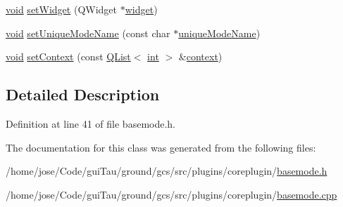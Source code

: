 \begin{DoxyCompactItemize}
\item 
\hyperlink{group___u_a_v_objects_plugin_ga444cf2ff3f0ecbe028adce838d373f5c}{void} \hyperlink{group___core_plugin_gab1cdd30e6cb316270fb623edf88388ff}{set\-Widget} (Q\-Widget $\ast$\hyperlink{group___core_plugin_ga458407ee9529a1d0067acd3e978ca63c}{widget})
\item 
\hyperlink{group___u_a_v_objects_plugin_ga444cf2ff3f0ecbe028adce838d373f5c}{void} \hyperlink{group___core_plugin_ga58eb3bd31c083e486287c4535f0f7379}{set\-Unique\-Mode\-Name} (const char $\ast$\hyperlink{group___core_plugin_ga5712eab4028d979aa83e70cc8dd3962b}{unique\-Mode\-Name})
\item 
\hyperlink{group___u_a_v_objects_plugin_ga444cf2ff3f0ecbe028adce838d373f5c}{void} \hyperlink{group___core_plugin_ga0a0f1f0ef4b5c8d0f4c597564986235c}{set\-Context} (const \hyperlink{class_q_list}{Q\-List}$<$ \hyperlink{ioapi_8h_a787fa3cf048117ba7123753c1e74fcd6}{int} $>$ \&\hyperlink{group___core_plugin_ga931f95d0ee3f352b7e43bbba9e228480}{context})
\end{DoxyCompactItemize}


\subsection{Detailed Description}


Definition at line 41 of file basemode.\-h.



The documentation for this class was generated from the following files\-:\begin{DoxyCompactItemize}
\item 
/home/jose/\-Code/gui\-Tau/ground/gcs/src/plugins/coreplugin/\hyperlink{basemode_8h}{basemode.\-h}\item 
/home/jose/\-Code/gui\-Tau/ground/gcs/src/plugins/coreplugin/\hyperlink{basemode_8cpp}{basemode.\-cpp}\end{DoxyCompactItemize}
